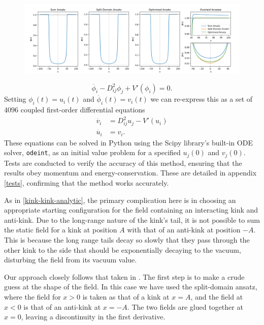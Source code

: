 \documentclass[11pt, oneside,titlepage]{article}  	%
\numberwithin{equation}{section}
\begin{document}
\begin{figure}
\centering
\includegraphics[width=\textwidth]{field_ansatze.png}
\label{ansatze}
\end{figure}
\begin{equation}
\ddot{\phi_i} - D^2_{ij}\phi_j + V'(\phi_i) = 0.
\end{equation}
Setting $\phi_i(t) = u_i(t)$ and $\dot{\phi_i}(t) = v_i(t)$ we can re-express this as a set of 4096 coupled first-order differential equations
\begin{align}
\dot{v_i} &= D^2_{ij}u_j - V'(u_i) \\
\dot{u_i} &= v_i .
\end{align}
 These equations can be solved in Python using the Scipy library's built-in ODE solver, \texttt{odeint}, as an initial value problem for a specified $u_{j}(0)$ and $v_{j}(0)$. Tests are conducted to verify the accuracy of this method, ensuring that the results obey momentum and energy-conservation. These are detailed in appendix \ref{tests}, confirming that the method works accurately.\par
 As in \textsection \ref{kink-kink-analytic}, the primary complication here is in choosing an appropriate starting configuration for the field containing an interacting kink and anti-kink. Due to the long-range nature of the kink's tail, it is not possible to sum the static field for a kink at position $A$ with that of an anti-kink at position $-A$. This is because the long range tails decay so slowly that they pass through the other kink to the side that should be exponentially decaying to the vacuum, disturbing the field from its vacuum value.\par
 Our approach closely follows that taken in \cite{christov-num}. The first step is to make a crude guess at the shape of the field. In this case we have used the split-domain ansatz, where the field for $x>0$ is taken as that of a kink at $x=A$, and the field at $x<0$ is that of an anti-kink at $x=-A$. The two fields are glued together at $x=0$, leaving a discontinuity in the first derivative.\par
\end{document}
